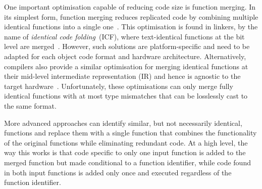 One important optimisation capable of reducing code size is function merging.
In its simplest form, function merging reduces replicated code by combining multiple identical functions into a single one~\cite{llvm-fm,livska14}.
This optimisation is found in linkers, by the name of \textit{identical code folding}~(ICF), where text-identical functions at the bit level are merged~\cite{tallam10,kwan12,msvc-icf}.
However, such solutions are platform-specific and need to be adapted for each object code format and hardware architecture.
Alternatively, compilers also provide a similar optimisation for merging identical functions at their mid-level intermediate representation (IR) and hence is agnostic to the target hardware~\cite{llvm-fm,livska14}.
Unfortunately, these optimisations can only merge fully identical functions with at most type mismatches that can be losslessly cast to the same format.

More advanced approaches can identify similar, but not necessarily identical, functions and replace them with a single function that combines the functionality of the original functions while eliminating redundant code.
At a high level, the way this works is that code specific to only one input function is added to the merged function but made conditional to a function identifier, while code found in both input functions is added only once and executed regardless of the function identifier.



